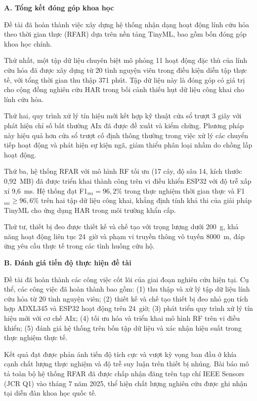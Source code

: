 \label{conclusion}

\textbf{A. Tổng kết đóng góp khoa học}

Đề tài đã hoàn thành việc xây dựng hệ thống nhận dạng hoạt động lính cứu hỏa theo thời gian thực (RFAR) dựa trên nền tảng TinyML, bao gồm bốn đóng góp khoa học chính.

Thứ nhất, một tập dữ liệu chuyên biệt mô phỏng 11 hoạt động đặc thù của lính cứu hỏa đã được xây dựng từ 20 tình nguyện viên trong điều kiện diễn tập thực tế, với tổng thời gian thu thập 371 phút. Tập dữ liệu này là đóng góp có giá trị cho cộng đồng nghiên cứu HAR trong bối cảnh thiếu hụt dữ liệu công khai cho lính cứu hỏa.

Thứ hai, quy trình xử lý tín hiệu mới kết hợp kỹ thuật cửa sổ trượt 3 giây với phát hiện chỉ số bất thường AIx đã được đề xuất và kiểm chứng. Phương pháp này hiệu quả hơn cửa sổ trượt cố định thông thường trong việc xử lý các chuyển tiếp hoạt động và phát hiện sự kiện ngã, giảm thiểu phân loại nhầm do chồng lấp hoạt động.

Thứ ba, hệ thống RFAR với mô hình RF tối ưu (17 cây, độ sâu 14, kích thước 0,92~MB) đã được triển khai thành công trên vi điều khiển ESP32 với độ trễ xấp xỉ 9,6~ms. Hệ thống đạt F1$_{mi} = 96{,}2\%$ trong thực nghiệm thời gian thực và F1$_{mi} \geq 96{,}6\%$ trên hai tập dữ liệu công khai, khẳng định tính khả thi của giải pháp TinyML cho ứng dụng HAR trong môi trường khẩn cấp.

Thứ tư, thiết bị đeo được thiết kế và chế tạo với trọng lượng dưới 200~g, khả năng hoạt động liên tục 24~giờ và phạm vi truyền thông vô tuyến 8000~m, đáp ứng yêu cầu thực tế trong các tình huống cứu hộ.

\textbf{B. Đánh giá tiến độ thực hiện đề tài}

Đề tài đã hoàn thành các công việc cốt lõi của giai đoạn nghiên cứu hiện tại. Cụ thể, các công việc đã hoàn thành bao gồm: (1) thu thập và xử lý tập dữ liệu lính cứu hỏa từ 20 tình nguyện viên; (2) thiết kế và chế tạo thiết bị đeo nhỏ gọn tích hợp ADXL345 và ESP32 hoạt động trên 24~giờ; (3) phát triển quy trình xử lý tín hiệu mới với cơ chế AIx; (4) tối ưu hóa và triển khai mô hình RF trên vi điều khiển; (5) đánh giá hệ thống trên bốn tập dữ liệu và xác nhận hiệu suất trong thực nghiệm thực tế.

Kết quả đạt được phản ánh tiến độ tích cực và vượt kỳ vọng ban đầu ở khía cạnh chất lượng thực nghiệm và độ trễ suy luận trên thiết bị nhúng. Bài báo mô tả toàn bộ hệ thống RFAR đã được chấp nhận đăng trên tạp chí IEEE Sensors (JCR Q1) vào tháng 7 năm 2025, thể hiện chất lượng nghiên cứu được ghi nhận tại diễn đàn khoa học quốc tế.

